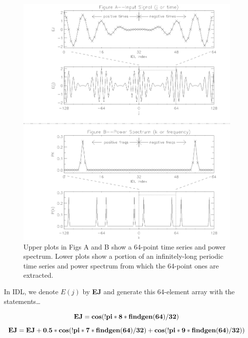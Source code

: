\documentclass[psfig,preprint]{aastex}
\begin{document}
\begin{figure}[p!]
\begin{center}
\leavevmode
\includegraphics[width=6.0in]{fourierbfig.ps}
\end{center}
\caption{Upper plots in Figs A and B show a 64-point time series and
power spectrum. Lower plots show a portion of an infinitely-long
periodic time series and power spectrum from which the 64-point ones are
extracted. \label{figtwo} }
\end{figure}

	In IDL, we denote $E(j)$ by {\bf EJ} and generate this
64-element array with the statements\dots

\begin{mathletters} 
\begin{equation} 
\bf{ EJ = cos( !pi * 8 * findgen(64)/32) }
\end{equation} 
\begin{equation} 
\bf{ EJ = EJ + 0.5*cos( !pi * 7
* findgen(64)/32) + cos( !pi * 9 * findgen(64)/32) ) }
\end{equation}
\end{mathletters}
\end{document}
